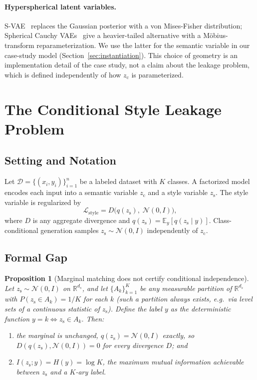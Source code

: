 \documentclass[10pt,letterpaper]{article}
\newcommand{\zc}{z_{\mathrm{c}}}
\newcommand{\zs}{z_{\mathrm{s}}}
\newcommand{\R}{\mathbb{R}}
\newtheorem{proposition}{Proposition}
\begin{document}
\paragraph{Hyperspherical latent variables.}
S-VAE~\citep{davidson2018hyperspherical} replaces the Gaussian posterior
with a von Mises-Fisher distribution; Spherical Cauchy
VAEs~\citep{sablica2025hyperspherical} give a heavier-tailed alternative
with a M\"obius-transform reparameterization. We use the latter for the
semantic variable in our case-study model (Section~\ref{sec:instantiation}).
This choice of geometry is an implementation detail of the case study, not
a claim about the leakage problem, which is defined independently of how
$\zc$ is parameterized.

\section{The Conditional Style Leakage Problem}
\label{sec:phenomenon}

\subsection{Setting and Notation}

Let $\mathcal{D}=\{(x_i,y_i)\}_{i=1}^n$ be a labeled dataset with $K$
classes. A factorized model encodes each input into a semantic variable
$\zc$ and a style variable $\zs$. The style variable is regularized by
\begin{equation}
  \mathcal{L}_{\mathrm{style}} = D\!\bigl(q(\zs),\;\mathcal{N}(0,I)\bigr),
  \label{eq:generic-style-reg}
\end{equation}
where $D$ is any aggregate divergence and $q(\zs)=\mathbb{E}_y[q(\zs\mid y)]$.
Class-conditional generation samples $\zs\sim\mathcal{N}(0,I)$ independently
of $\zc$.

\subsection{Formal Gap}
\label{sec:formal-gap}

\begin{proposition}[Marginal matching does not certify conditional independence]
\label{prop:marginal-not-sufficient}
Let $\zs\sim\mathcal N(0,I)$ on $\R^{d_s}$, and let $\{A_k\}_{k=1}^K$ be any
measurable partition of $\R^{d_s}$ with $P(\zs\in A_k)=1/K$ for each $k$
(such a partition always exists, e.g.\ via level sets of a continuous
statistic of $\zs$). Define the label $y$ as the deterministic function
$y=k \iff \zs\in A_k$. Then:
\begin{enumerate}[leftmargin=*,topsep=1pt,itemsep=1pt]
  \item[(i)] the marginal is unchanged, $q(\zs)=\mathcal N(0,I)$ exactly, so
        $D(q(\zs),\mathcal N(0,I))=0$ for \emph{every} divergence $D$; and
  \item[(ii)] $I(\zs;y)=H(y)=\log K$, the maximum mutual information
        achievable between $\zs$ and a $K$-ary label.
\end{enumerate}
\end{proposition}
\end{document}
